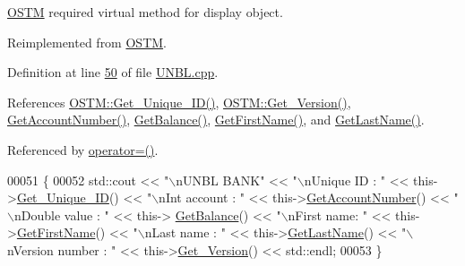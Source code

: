 \hyperlink{class_o_s_t_m}{O\+S\+TM} required virtual method for display object. 



Reimplemented from \hyperlink{class_o_s_t_m_a513396a115f2987fd07c203309ae8a59_a513396a115f2987fd07c203309ae8a59}{O\+S\+TM}.



Definition at line \hyperlink{_u_n_b_l_8cpp_source_l00050}{50} of file \hyperlink{_u_n_b_l_8cpp_source}{U\+N\+B\+L.\+cpp}.



References \hyperlink{_o_s_t_m_8cpp_source_l00073}{O\+S\+T\+M\+::\+Get\+\_\+\+Unique\+\_\+\+I\+D()}, \hyperlink{_o_s_t_m_8cpp_source_l00089}{O\+S\+T\+M\+::\+Get\+\_\+\+Version()}, \hyperlink{_u_n_b_l_8cpp_source_l00075}{Get\+Account\+Number()}, \hyperlink{_u_n_b_l_8cpp_source_l00067}{Get\+Balance()}, \hyperlink{_u_n_b_l_8cpp_source_l00091}{Get\+First\+Name()}, and \hyperlink{_u_n_b_l_8cpp_source_l00083}{Get\+Last\+Name()}.



Referenced by \hyperlink{_u_n_b_l_8h_source_l00060}{operator=()}.


\begin{DoxyCode}
00051 \{
00052    std::cout << \textcolor{stringliteral}{"\(\backslash\)nUNBL BANK"} << \textcolor{stringliteral}{"\(\backslash\)nUnique ID : "} << this->\hyperlink{class_o_s_t_m_a5a01a8b98d16b1d1904ecf9356e7b71d_a5a01a8b98d16b1d1904ecf9356e7b71d}{Get\_Unique\_ID}() << \textcolor{stringliteral}{"\(\backslash\)nInt account :
       "} << this->\hyperlink{class_u_n_b_l_a44a84fb7fe8778e3048921581049c715_a44a84fb7fe8778e3048921581049c715}{GetAccountNumber}() << \textcolor{stringliteral}{"\(\backslash\)nDouble value : "} << this->
      \hyperlink{class_u_n_b_l_ad5b882bff8d1e2619b2ebbd170345c99_ad5b882bff8d1e2619b2ebbd170345c99}{GetBalance}() << \textcolor{stringliteral}{"\(\backslash\)nFirst name: "} << this->\hyperlink{class_u_n_b_l_ae89215b95f2e11aa70f9c8bbfd55c10c_ae89215b95f2e11aa70f9c8bbfd55c10c}{GetFirstName}() << \textcolor{stringliteral}{"\(\backslash\)nLast name : "} << 
      this->\hyperlink{class_u_n_b_l_a27f19f2af5e1abd33b5c63f16b493f6c_a27f19f2af5e1abd33b5c63f16b493f6c}{GetLastName}()  << \textcolor{stringliteral}{"\(\backslash\)nVersion number : "} << this->\hyperlink{class_o_s_t_m_a1f1db9d482f22c8e7caa17dfb340626b_a1f1db9d482f22c8e7caa17dfb340626b}{Get\_Version}() << std::endl;
00053 \}
\end{DoxyCode}


